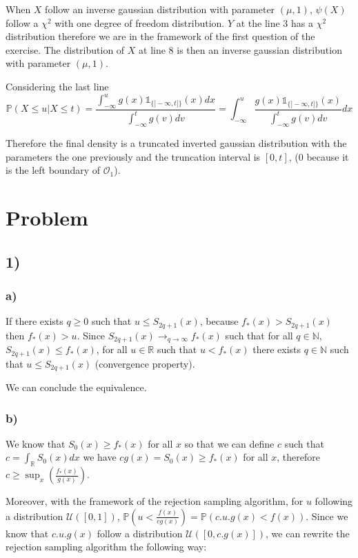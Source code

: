When $X$ follow an inverse gaussian distribution with parameter $(\mu,1)$, $\psi(X)$ follow a $\chi^2$ with one degree of freedom distribution.
$Y$ at the line 3 has a $\chi^2$ distribution therefore we are in the framework of the first question of the exercise.
The distribution of $X$ at line $8$ is then an inverse gaussian distribution with parameter $(\mu,1)$.

Considering the last line
\[ \mathbb{P}(X \leq u | X \leq t) = \frac{\int_{-\infty}^u g(x) \mathbb{1}_{\{]-\infty, t]\}}(x) dx}{\int_{-\infty}^t g(v)dv} =  \int_{-\infty}^u \frac{g(x)\mathbb{1}_{\{]-\infty, t]\}}(x)}{\int_{-\infty}^t g(v)dv}dx\]

Therefore the final density is a truncated inverted gaussian distribution with the parameters the one previously and the truncation interval is $[0, t]$, ($0$ because it is the left boundary of $\mathcal{O}_1$).

\section*{Problem}
\subsection*{1)}
\subsubsection*{a)}

If there exists $q \geq 0$ such that $u \leq S_{2q+1}(x)$, because $f_*(x) > S_{2q+1}(x)$ then $f_*(x) > u$.
Since $S_{2q+1}(x) \rightarrow_{q \rightarrow \infty} f_*(x)$ such that for all $q \in \mathbb{N}$, $S_{2q+1}(x) \leq f_*(x)$, for all $u \in \mathbb{R}$ such that $u < f_{*}(x)$ there exists $q \in \mathbb{N}$ such that $u \leq S_{2q+1}(x)$ (convergence property). 

We can conclude the equivalence.

\subsubsection{b)}

We know that $S_0(x) \geq f_*(x)$ for all $x$ so that we can define $c$ such that $c = \int_{\mathbb{R}} S_0(x)dx$ we have $cg(x) = S_0(x) \geq f_*(x)$ for all $x$, therefore $c \geq \sup_x\left( \frac{f_*(x)}{g(x)} \right)$.

Moreover, with the framework of the rejection sampling algorithm, for $u$ following a distribution $\mathcal{U}([0,1])$, $\mathbb{P}(u < \frac{f(x)}{cg(x)}) = \mathbb{P}(c .u. g(x) < f(x))$. Since we know that $c.u.g(x)$ follow a distribution $\mathcal{U}([0,c.g(x)])$, we can rewrite the rejection sampling algorithm the following way:

